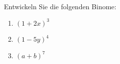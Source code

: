 \begin{ExerciseBlock}
Entwickeln Sie die folgenden Binome:
\begin{enumerate}[label=\alph*)]
	\item $\displaystyle (1+2x)^3$
	\item $\displaystyle (1-5y)^4$
	\item $\displaystyle \left(a+b\right)^7$
\end{enumerate}

\end{ExerciseBlock}

